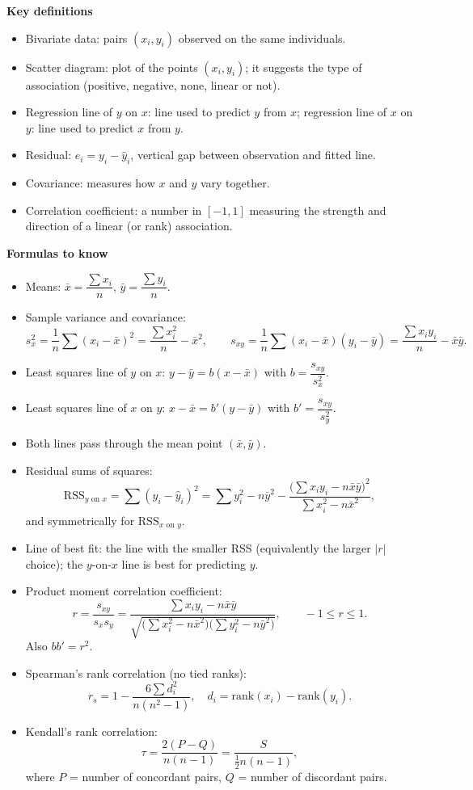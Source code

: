 \documentclass[11pt]{article}
\newcommand{\cle}[1]{{\popxbold\color{popdark}#1}}
\begin{document}
\begin{bilan}
\textbf{Key definitions}
\begin{itemize}
\item \cle{Bivariate data}: pairs $(x_i,y_i)$ observed on the same individuals.
\item \cle{Scatter diagram}: plot of the points $(x_i,y_i)$; it suggests the type of association (positive, negative, none, linear or not).
\item \cle{Regression line of $y$ on $x$}: line used to predict $y$ from $x$; \cle{regression line of $x$ on $y$}: line used to predict $x$ from $y$.
\item \cle{Residual}: $e_i=y_i-\hat y_i$, vertical gap between observation and fitted line.
\item \cle{Covariance}: measures how $x$ and $y$ vary together.
\item \cle{Correlation coefficient}: a number in $[-1,1]$ measuring the strength and direction of a linear (or rank) association.
\end{itemize}

\textbf{Formulas to know}
\begin{itemize}
\item Means: $\bar x=\dfrac{\sum x_i}{n}$, $\bar y=\dfrac{\sum y_i}{n}$.
\item Sample variance and covariance:
\[ s_x^2=\frac{1}{n}\sum(x_i-\bar x)^2=\frac{\sum x_i^2}{n}-\bar x^2,\qquad
s_{xy}=\frac{1}{n}\sum(x_i-\bar x)(y_i-\bar y)=\frac{\sum x_iy_i}{n}-\bar x\bar y. \]
\item Least squares line of $y$ on $x$: $y-\bar y=b(x-\bar x)$ with $b=\dfrac{s_{xy}}{s_x^2}$.
\item Least squares line of $x$ on $y$: $x-\bar x=b'(y-\bar y)$ with $b'=\dfrac{s_{xy}}{s_y^2}$.
\item Both lines pass through the \cle{mean point} $(\bar x,\bar y)$.
\item Residual sums of squares:
\[ \mathrm{RSS}_{y\text{ on }x}=\sum(y_i-\hat y_i)^2=\sum y_i^2-n\bar y^2-\frac{\bigl(\sum x_iy_i-n\bar x\bar y\bigr)^2}{\sum x_i^2-n\bar x^2}, \]
and symmetrically for $\mathrm{RSS}_{x\text{ on }y}$.
\item \cle{Line of best fit}: the line with the smaller RSS (equivalently the larger $|r|$ choice); the $y$-on-$x$ line is best for predicting $y$.
\item Product moment correlation coefficient:
\[ r=\frac{s_{xy}}{s_x s_y}=\frac{\sum x_iy_i-n\bar x\bar y}{\sqrt{\bigl(\sum x_i^2-n\bar x^2\bigr)\bigl(\sum y_i^2-n\bar y^2\bigr)}},\qquad -1\le r\le 1. \]
Also $bb'=r^2$.
\item Spearman's rank correlation (no tied ranks):
\[ r_s=1-\frac{6\sum d_i^2}{n(n^2-1)},\quad d_i=\text{rank}(x_i)-\text{rank}(y_i). \]
\item Kendall's rank correlation:
\[ \tau=\frac{2(P-Q)}{n(n-1)}=\frac{S}{\tfrac12 n(n-1)}, \]
where $P$ = number of concordant pairs, $Q$ = number of discordant pairs.
\end{itemize}


\end{bilan}
\end{document}
